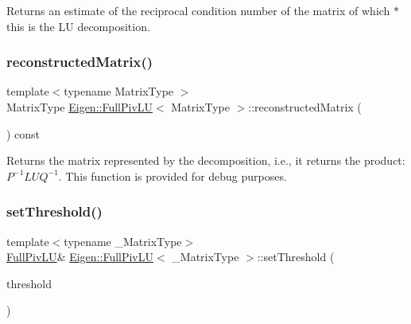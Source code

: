 \begin{DoxyReturn}{Returns}
an estimate of the reciprocal condition number of the matrix of which {\ttfamily $\ast$this} is the LU decomposition. 
\end{DoxyReturn}
\mbox{\label{class_eigen_1_1_full_piv_l_u_a191a4f598b0c192a83ab48984e87ee51}} 
\subsubsection{\texorpdfstring{reconstructedMatrix()}{reconstructedMatrix()}}
{\footnotesize\ttfamily template$<$typename Matrix\+Type $>$ \\
Matrix\+Type \mbox{\hyperlink{class_eigen_1_1_full_piv_l_u}{Eigen\+::\+Full\+Piv\+LU}}$<$ Matrix\+Type $>$\+::reconstructed\+Matrix (\begin{DoxyParamCaption}{ }\end{DoxyParamCaption}) const}

\begin{DoxyReturn}{Returns}
the matrix represented by the decomposition, i.\+e., it returns the product\+: $ P^{-1} L U Q^{-1} $. This function is provided for debug purposes. 
\end{DoxyReturn}
\mbox{\label{class_eigen_1_1_full_piv_l_u_a414592d82de98f5bd075965caf56d681}} 
\subsubsection{\texorpdfstring{setThreshold()}{setThreshold()}\hspace{0.1cm}{\footnotesize\ttfamily [1/2]}}
{\footnotesize\ttfamily template$<$typename \+\_\+\+Matrix\+Type$>$ \\
\mbox{\hyperlink{class_eigen_1_1_full_piv_l_u}{Full\+Piv\+LU}}\& \mbox{\hyperlink{class_eigen_1_1_full_piv_l_u}{Eigen\+::\+Full\+Piv\+LU}}$<$ \+\_\+\+Matrix\+Type $>$\+::set\+Threshold (\begin{DoxyParamCaption}\item[{const Real\+Scalar \&}]{threshold }\end{DoxyParamCaption})\hspace{0.3cm}{\ttfamily [inline]}}

